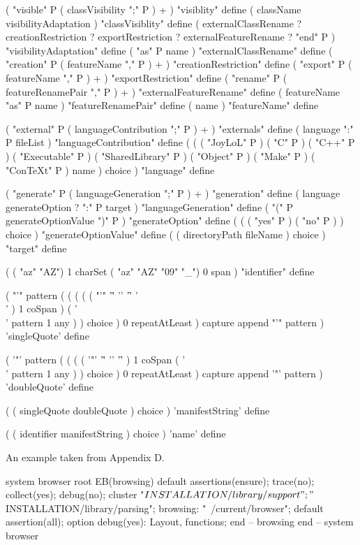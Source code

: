 ( "visible" P ( classVisibility ";" P ) + ) "visiblity" define
( className visibilityAdaptation ) "classVisiblity" define
(
  externalClassRename ?
  creationRestriction ?
  exportRestriction ?
  externalFeatureRename ?
  "end" P 
) "visibilityAdaptation" define
( "as" P name ) "externalClassRename" define
( "creation" P ( featureName "," P ) + ) "creationRestriction" define
( "export" P ( featureName "," P ) + ) "exportRestriction" define
( "rename" P ( featureRenamePair "," P ) + ) "externalFeatureRename" define
( featureName "as" P name ) "featureRenamePair" define
( name ) "featureName" define

( "external" P ( languageContribution ";" P ) + ) "externals" define
( language ":" P fileList ) "languageContribution" define
(
  (
    ( "JoyLoL" P )
    ( "C" P )
    ( "C++" P )
    ( "Executable" P )
    ( "SharedLibrary" P )
    ( "Object" P )
    ( "Make" P )
    ( "ConTeXt" P )
    name
  ) choice
) "language" define

( "generate" P ( languageGeneration ";" P ) + ) "generation" define
( language generateOption ? ":" P target ) "languageGeneration" define
( "(" P generateOptionValue ")" P ) "generateOption" define
(
  (
    ( "yes" P )
    ( "no" P )
  ) choice
) "generateOptionValue" define
( ( directoryPath fileName ) choice ) "target" define

(
  ( "az" "AZ") 1 charSet
  ( "az" "AZ" "09" "_") 0 span
) "identifier" define

(
  "'" pattern
  (
    ( 
      (
        ( ( "'" '\r' '\n' '\f' '\\' ) 1 coSpan )
        ( '\\' pattern 1 any )
      ) choice
    ) 0 repeatAtLeast
  ) capture append
  "'" pattern
) 'singleQuote' define

(
  '"' pattern
  (
    ( 
      (
        ( '"' '\r' '\n' '\f' ) 1 coSpan
        ( '\\' pattern 1 any )
      ) choice
    ) 0 repeatAtLeast
  ) capture append
  '"' pattern
) 'doubleQuote' define

(
  ( singleQuote doubleQuote ) choice
) 'manifestString' define

(
  ( identifier manifestString ) choice
) 'name' define
\stopJoylolCode

An example taken from \cite{meyer1992eiffelTheLanguage} Appendix D.

\starttyping
system browser root
  EB(browsing)
default
  assertions(ensure); 
  trace(no);
  collect(yes);
  debug(no);
cluster
  "$INSTALLATION/library/support";
  "$INSTALLATION/library/parsing";
  browsing: "~/current/browser";
  default
    assertion(all);
  option
    debug(yes): Layout, functions;
  end -- browsing
end -- system browser
\stoptyping
